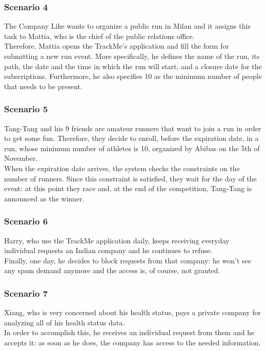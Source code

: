 \subsubsection{Scenario 4}
The Company Like wants to organize a public run in Milan and it assigns this task to Mattia, who is the chief of the public relations office. \\
Therefore, Mattia opens the TrackMe's application and fill the form for submitting a new run event. 
More specifically, he defines the name of the run, its path, the date and the time in which the run will start, and a closure date for the subscriptions. 
Furthermore, he also specifies 10 as the minimum number of people that needs to be present.

\subsubsection{Scenario 5}
Tang-Tang and his 9 friends are amateur runners that want to join a run in order to get some fun. 
Therefore, they decide to enroll, before the expiration date, in a run, whose minimum number of athletes is 10, organized by Abibas on the 5th of November. \\
When the expiration date arrives, the system checks the constraints on the number of runners. 
Since this constraint is satisfied, they wait for the day of the event: at this point they race and, at the end of the competition, Tang-Tang is announced as the winner. 

\subsubsection{Scenario 6}
Harry, who use the TrackMe application daily, keeps receiving everyday individual requests an Indian company and he continues to refuse.\\
Finally, one day, he decides to block requests from that company: he won't see any spam demand anymore and the access is, of course, not granted. 

\subsubsection{Scenario 7}
Xiang, who is very concerned about his health status, pays a private company for analyzing all of his health status data. \\ 
In order to accomplish this, he receives an individual request from them and he accepts it: as soon as he does, the company has access to the needed information.

